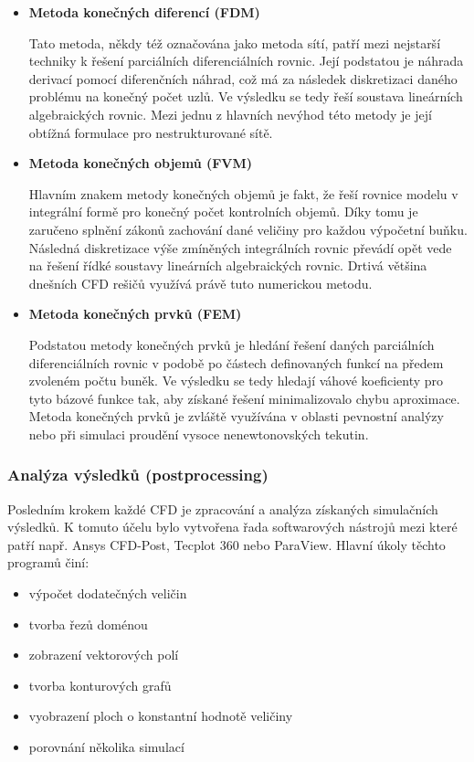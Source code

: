 \begin{itemize}[itemsep=0pt,parsep=0pt,partopsep=0pt,topsep=0pt]
  \item \textbf{Metoda konečných diferencí (FDM)}
  
  Tato metoda, někdy též označována jako metoda sítí, patří mezi nejstarší techniky k řešení parciálních diferenciálních rovnic. Její podstatou je náhrada derivací pomocí diferenčních náhrad, což má za následek diskretizaci daného problému na konečný počet uzlů. Ve výsledku se tedy řeší soustava lineárních algebraických rovnic. Mezi jednu z hlavních nevýhod této metody je její obtížná formulace pro nestrukturované sítě. 
  \item \textbf{Metoda konečných objemů (FVM)}
  
  Hlavním znakem metody konečných objemů je fakt, že řeší rovnice modelu v integrální formě pro konečný počet kontrolních objemů. Díky tomu je zaručeno splnění zákonů zachování dané veličiny pro každou výpočetní buňku. Následná diskretizace výše zmíněných integrálních rovnic převádí opět vede na řešení řídké soustavy lineárních algebraických rovnic. Drtivá většina dnešních CFD rešičů využívá právě tuto numerickou metodu. 
  
  \item \textbf{Metoda konečných prvků (FEM)}
  
  Podstatou metody konečných prvků je hledání řešení daných parciálních diferenciálních rovnic v podobě po částech definovaných funkcí na předem zvoleném počtu buněk. Ve výsledku se tedy hledají váhové koeficienty pro tyto bázové funkce tak, aby získané řešení minimalizovalo chybu aproximace. Metoda konečných prvků je zvláště využívána v oblasti pevnostní analýzy nebo při simulaci proudění vysoce nenewtonovských tekutin.  
\end{itemize}

\subsubsection{Analýza výsledků (postprocessing)}
Posledním krokem každé CFD je zpracování a analýza získaných simulačních výsledků. K tomuto účelu bylo vytvořena řada softwarových nástrojů mezi které patří např. Ansys CFD-Post, Tecplot 360 nebo ParaView. Hlavní úkoly těchto programů činí:

\begin{itemize}[itemsep=0pt,parsep=0pt,partopsep=0pt,topsep=0pt]
  \item výpočet dodatečných veličin
  \item tvorba řezů doménou
  \item zobrazení vektorových polí
  \item tvorba konturových grafů
  \item vyobrazení ploch o konstantní hodnotě veličiny
  \item porovnání několika simulací
\end{itemize}

